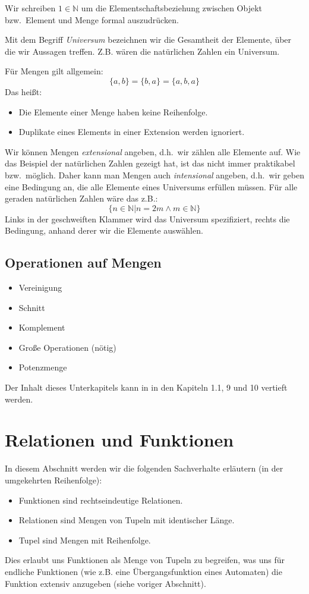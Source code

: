 Wir schreiben $1 \in \mathbb{N}$
um die Elementschaftsbeziehung zwischen Objekt bzw.\ Element und Menge formal auszudrücken.

Mit dem Begriff \emph{Universum} bezeichnen wir die Gesamtheit der Elemente,
über die wir Aussagen treffen.
Z.B. wären die natürlichen Zahlen ein Universum.

Für Mengen gilt allgemein:
\[ \{a,b\} = \{b,a\} = \{a,b,a\} \]
Das heißt:
\begin{itemize}
    \item Die Elemente einer Menge haben keine Reihenfolge.
    \item Duplikate eines Elements in einer Extension werden ignoriert.
\end{itemize}

Wir können Mengen \emph{extensional} angeben, d.h.\ wir zählen alle Elemente auf.
Wie das Beispiel der natürlichen Zahlen gezeigt hat,
ist das nicht immer praktikabel bzw.\ möglich.
Daher kann man Mengen auch \emph{intensional} angeben,
d.h.\ wir geben eine Bedingung an, die alle Elemente eines Universums erfüllen müssen.
Für alle geraden natürlichen Zahlen wäre das z.B.:
\[\{n \in \mathbb{N} | n = 2m \wedge m \in \mathbb{N} \}\]
Links in der geschweiften Klammer wird das Universum spezifiziert,
rechts die Bedingung, anhand derer wir die Elemente auswählen.

\subsection{Operationen auf Mengen}

\begin{itemize}
    \item Vereinigung
    \item Schnitt
    \item Komplement
    \item Große Operationen (nötig)
    \item Potenzmenge
\end{itemize}

Der Inhalt dieses Unterkapitels kann in \cite{link}
in den Kapiteln 1.1, 9 und 10 vertieft werden.

\section{Relationen und Funktionen}\label{relationenUndFunktionen}
In diesem Abschnitt werden wir die folgenden Sachverhalte erläutern
(in der umgekehrten Reihenfolge):
\begin{itemize}
    \item Funktionen sind rechtseindeutige Relationen.
    \item Relationen sind Mengen von Tupeln mit identischer Länge.
    \item Tupel sind Mengen mit Reihenfolge.
\end{itemize}
Dies erlaubt uns Funktionen als Menge von Tupeln zu begreifen,
was uns für endliche Funktionen
(wie z.B. eine Übergangsfunktion eines Automaten)
die Funktion extensiv anzugeben (siehe voriger Abschnitt).


